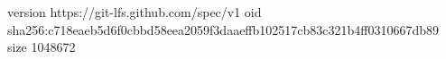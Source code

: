 version https://git-lfs.github.com/spec/v1
oid sha256:c718eaeb5d6f0cbbd58eea2059f3daaeffb102517cb83c321b4ff0310667db89
size 1048672
